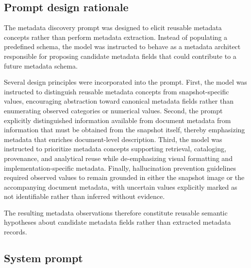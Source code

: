 \documentclass{article}
\begin{document}
\subsection{Prompt design rationale}

The metadata discovery prompt was designed to elicit reusable metadata concepts rather than perform metadata extraction. Instead of populating a predefined schema, the model was instructed to behave as a metadata architect responsible for proposing candidate metadata fields that could contribute to a future metadata schema.

Several design principles were incorporated into the prompt. First, the model was instructed to distinguish reusable metadata concepts from snapshot-specific values, encouraging abstraction toward canonical metadata fields rather than enumerating observed categories or numerical values. Second, the prompt explicitly distinguished information available from document metadata from information that must be obtained from the snapshot itself, thereby emphasizing metadata that enriches document-level description. Third, the model was instructed to prioritize metadata concepts supporting retrieval, cataloging, provenance, and analytical reuse while de-emphasizing visual formatting and implementation-specific metadata. Finally, hallucination prevention guidelines required observed values to remain grounded in either the snapshot image or the accompanying document metadata, with uncertain values explicitly marked as not identifiable rather than inferred without evidence.

The resulting metadata observations therefore constitute reusable semantic hypotheses about candidate metadata fields rather than extracted metadata records.

\subsection{System prompt}
\end{document}
